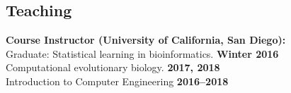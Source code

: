 \documentclass[margin,line,letterpaper]{resume}
\begin{document}
\begin{resume}



    \section{\mysidestyle Teaching}

    \textbf{Course Instructor (University of California, San Diego):}\vspace{2mm}\\\vspace{1mm}%
     Graduate: Statistical learning in bioinformatics. \hfill \textbf{Winter 2016}\\
      Computational evolutionary biology. \hfill \textbf{2017, 2018}\\
     Introduction to Computer Engineering  \hfill \textbf{2016--2018}



\end{resume}
\end{document}
